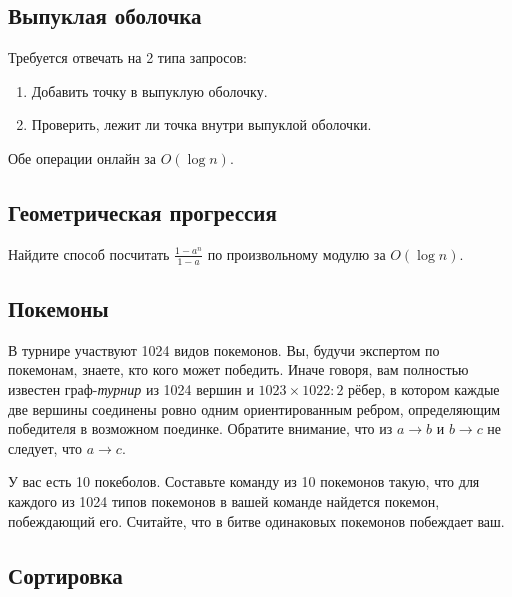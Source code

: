\documentclass[11pt]{article}
\providecommand{\tightlist}{%
      \setlength{\itemsep}{0pt}\setlength{\parskip}{0pt}}
\begin{document}
    \subsection{Выпуклая
оболочка}\label{ux432ux44bux43fux443ux43aux43bux430ux44f-ux43eux431ux43eux43bux43eux447ux43aux430}

Требуется отвечать на 2 типа запросов:

\begin{enumerate}
\def\labelenumi{\arabic{enumi}.}
\tightlist
\item
  Добавить точку в выпуклую оболочку.
\item
  Проверить, лежит ли точка внутри выпуклой оболочки.
\end{enumerate}

Обе операции онлайн за \(O(\log n)\).

    \subsection{Геометрическая
прогрессия}\label{ux433ux435ux43eux43cux435ux442ux440ux438ux447ux435ux441ux43aux430ux44f-ux43fux440ux43eux433ux440ux435ux441ux441ux438ux44f}

Найдите способ посчитать \(\frac{1-a^n}{1-a}\) по произвольному модулю
за \(O(\log n)\).

    \subsection{Покемоны}\label{ux43fux43eux43aux435ux43cux43eux43dux44b}

В турнире участвуют 1024 видов покемонов. Вы, будучи экспертом по
покемонам, знаете, кто кого может победить. Иначе говоря, вам полностью
известен граф-\emph{турнир} из 1024 вершин и \(1023 \times 1022 : 2\)
рёбер, в котором каждые две вершины соединены ровно одним
ориентированным ребром, определяющим победителя в возможном поединке.
Обратите внимание, что из \(a \to b\) и \(b \to c\) не следует, что
\(a \to c\).

У вас есть 10 покеболов. Составьте команду из 10 покемонов такую, что
для каждого из 1024 типов покемонов в вашей команде найдется покемон,
побеждающий его. Считайте, что в битве одинаковых покемонов побеждает
ваш.

    \subsection{Сортировка}\label{ux441ux43eux440ux442ux438ux440ux43eux432ux43aux430}
\end{document}
